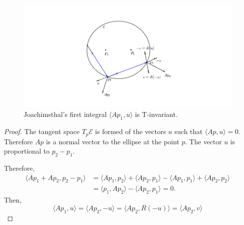 \begin{figure}[H]
	\begin{center}
	 \includegraphics[trim=70 10 120 20,clip,width=\textwidth]{pics_tex/joachimstall.pdf}
		\caption {Joachimsthal's first integral  $ \langle Ap_1,u\rangle $ is T-invariant.}
		 \label{fig:joachim}
	\end{center}
\end{figure}

\begin{proof} The tangent space  $T_{p}\mathcal{E}$ is formed of the vectors $u$ such that $ \langle Ap,u\rangle =0.$ Therefore $Ap$ is a normal vector to the ellipse at the point $p$. The vector $u$ is proportional to $p_2-p_1$.
	
	Therefore,
	\begin{align*}  \langle Ap_1+Ap_2 , p_2-p_1\rangle &= \langle Ap_1  , p_2 \rangle + \langle Ap_2  , p_1 \rangle  - \langle Ap_1  , p_1 \rangle + \langle Ap_2  , p_2 \rangle \\
	&= \langle  p_1  , Ap_2 \rangle - \langle Ap_2  , p_1 \rangle =0. 
	\end{align*}
	Then,
	\[ \langle Ap_1 , u\rangle =\langle  Ap_2 ,-u\rangle  =  \langle  Ap_2 ,R(-u)\rangle  =  \langle  Ap_2, v\rangle \]
	\end{proof}